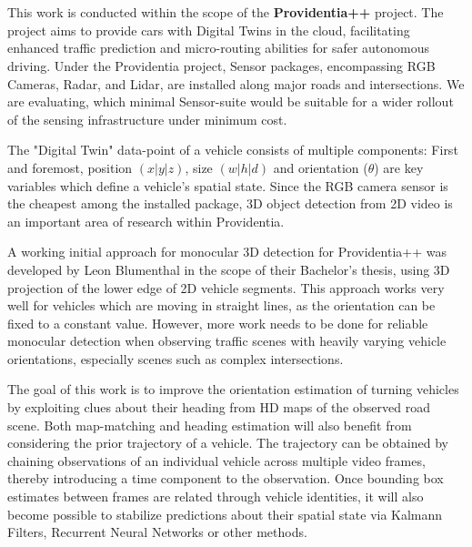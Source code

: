 \documentclass[RAIstudentexpose%
              ,optBibtex%
              ,optBibstyleAlphabetic%
              ,optEnglish%
              ]{RAIlatex}%
\begin{document}
%


%

\section{}

This work is conducted within the scope of the \textbf{Providentia++} project. The project aims to provide cars with Digital Twins in the cloud, facilitating enhanced traffic prediction and micro-routing abilities for safer autonomous driving. Under the Providentia project, Sensor packages, encompassing RGB Cameras, Radar, and Lidar, are installed along major roads and intersections. We are evaluating, which minimal Sensor-suite would be suitable for a wider rollout of the sensing infrastructure under minimum cost. 

The "Digital Twin" data-point of a vehicle consists of multiple components: First and foremost, position $\left(x|y|z\right)$, size $\left(w|h|d\right)$ and orientation ($\theta$) are key variables which define a vehicle's spatial state. Since the RGB camera sensor is the cheapest among the installed package, 3D object detection from 2D video is an important area of research within Providentia.

A working initial approach for monocular 3D detection for Providentia++ was developed by Leon Blumenthal \cite{thesisleon} in the scope of their Bachelor's thesis, using 3D projection of the lower edge of 2D vehicle segments. This approach works very well for vehicles which are moving in straight lines, as the orientation can be fixed to a constant value. However, more work needs to be done for reliable monocular detection when observing traffic scenes with heavily varying vehicle orientations, especially scenes such as complex intersections.

The goal of this work is to improve the orientation estimation of turning vehicles by exploiting clues about their heading from HD maps of the observed road scene. Both map-matching and heading estimation will also benefit from considering the prior trajectory of a vehicle. The trajectory can be obtained by chaining observations of an individual vehicle across multiple video frames, thereby introducing a time component to the observation. Once bounding box estimates between frames are related through vehicle identities, it will also become possible to stabilize predictions about their spatial state via Kalmann Filters, Recurrent Neural Networks or other methods.
\end{document}
